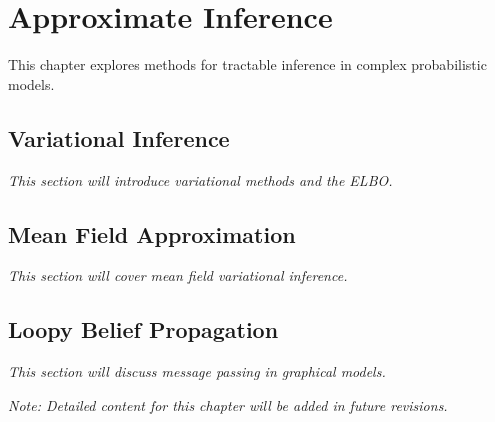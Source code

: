 
\chapter{Approximate Inference}
\label{chap:approximate-inference}

This chapter explores methods for tractable inference in complex probabilistic models.

\section{Variational Inference}

\textit{This section will introduce variational methods and the ELBO.}

\section{Mean Field Approximation}

\textit{This section will cover mean field variational inference.}

\section{Loopy Belief Propagation}

\textit{This section will discuss message passing in graphical models.}

\vspace{1em}
\noindent\textit{Note: Detailed content for this chapter will be added in future revisions.}
